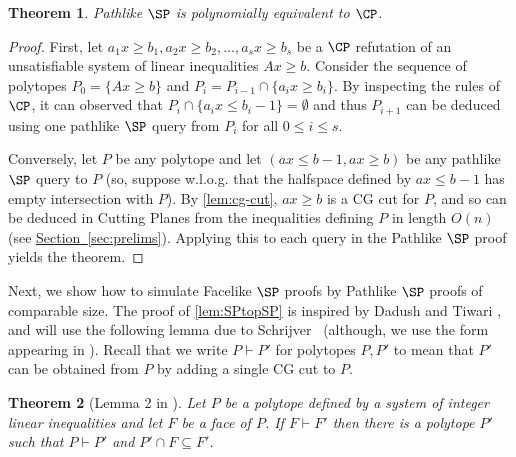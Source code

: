 \documentclass[11pt]{article}
\numberwithin{equation}{section}
\newtheorem{theorem}{Theorem}[section]
\theoremstyle{definition}
\theoremstyle{plain}
\newcommand{\expref}[2]{\hyperref[#2]{#1~\ref{#2}}}
\begin{document}
\begin{theorem}\label{lem:pathsp-cp}
	 Pathlike $\SP$ is polynomially equivalent to $\CP$. 	
\end{theorem}
\begin{proof}
	First, let $a_1x \geq b_1, a_2x \geq b_2, \ldots, a_sx \geq b_s$ be a $\CP$ refutation of an unsatisfiable system of linear inequalities $Ax \geq b$. 
	Consider the sequence of polytopes $P_0 =\{Ax \geq b\}$ and $P_i = P_{i-1} \cap \{a_i x \geq b_i\}$. 
	By inspecting the rules of $\CP$, it can observed that $P_i \cap \{a_ix \leq b_i-1\}= \emptyset$ and thus $P_{i+1}$ can be deduced using one pathlike $\SP$ query from $P_i$ for all $0 \leq i \leq s$.
	
	Conversely, let $P$ be any polytope and let $(ax \leq b-1, ax \geq b)$ be any pathlike $\SP$ query to $P$ (so, suppose w.l.o.g. that the halfspace defined by $ax \leq b-1$ has empty intersection with $P$).
	By \autoref{lem:cg-cut}, $ax \geq b$ is a CG cut for $P$, and so can be deduced in Cutting Planes from the inequalities defining $P$ in length $O(n)$
%
(see \expref{Section}{sec:prelims}).    %
	Applying this to each query in the Pathlike $\SP$ proof yields the theorem.
%
%
%
%
%
%
\end{proof}
	Next, we show how to simulate Facelike $\SP$ proofs by Pathlike $\SP$ proofs of comparable size.
	The proof of \autoref{lem:SPtopSP} is inspired by Dadush and Tiwari \cite{TseitinUpperBound}, and will use the following lemma due to Schrijver~\cite{SCHRIJVER1980291} (although, we use the form appearing in \cite{CookCT87}).
	Recall that we write $P \vdash P'$ for polytopes $P, P'$ to mean that $P'$ can be obtained from $P$ by adding a single CG cut to $P$.
	\begin{theorem}[Lemma 2 in \cite{CookCT87}]
	\label{lem:shrijver}
		Let $P$ be a polytope defined by a system of integer linear inequalities and let $F$ be a face of $P$. 
		If $F \vdash F'$ then there is a polytope $P'$ such that $P \vdash P'$ and $P' \cap F \subseteq F'$.
	\end{theorem}
	
\end{document}
